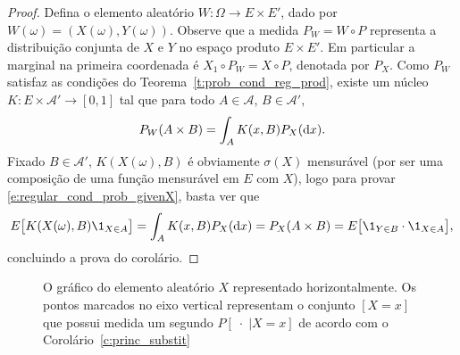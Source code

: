 \begin{proof}
  Defina o elemento aleatório $W: \Omega \to E \times E'$, dado por $W(\omega) = (X(\omega), Y(\omega))$.
  Observe que a medida $P_W = W \circ P$ representa a distribuição conjunta de $X$ e $Y$ no espaço produto $E \times E'$.
  Em particular a marginal na primeira coordenada é $X_1 \circ P_W = X \circ P$, denotada por $P_X$.
  Como $P_W$ satisfaz as condições do Teorema~\ref{t:prob_cond_reg_prod}, existe um núcleo $K: E \times \mathcal{A}' \to [0,1]$ tal que
  para todo $A \in \mathcal{A}$, $B \in \mathcal{A}'$,
  \begin{equation}
    P_W(A \times B) = \int_A K(x, B) P_X (\mathop{}\!\mathrm{d} x).
  \end{equation}
  Fixado $B \in \mathcal{A}'$, $K(X(\omega), B)$ é obviamente $\sigma(X)$ mensurável (por ser uma composição de uma função mensurável em $E$ com $X$), logo para provar \ref{e:regular_cond_prob_givenX}, basta ver que
  \begin{equation}
    E\big[ K(X(\omega), B) \1_{X \in A} \big] = \int_A K(x, B) P_X (\d x) = P_X (A \times B) = E\big[ \1_{Y \in B} \cdot \1_{X \in A} \big],
  \end{equation}
  concluindo a prova do corolário.
\end{proof}

\begin{figure}[!ht]
  \centering
  \caption{O gráfico do elemento aleatório $X$ representado horizontalmente.
    Os pontos marcados no eixo vertical representam o conjunto $[X = x]$ que possui medida um segundo $P[\; \cdot \; | X = x]$ de acordo com o Corolário~\ref{c:princ_substit}}
\end{figure}

